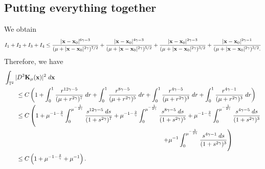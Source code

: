 \subsection{Putting everything together}
We obtain
\begin{align*}
    I_1+I_2+I_3+I_4 \leq  
                \frac
                {
                    |\mathbf{x}-\mathbf{x}_0|^{6\gamma-3}
                }
                {
                    (\mu+|\mathbf{x}-\mathbf{x}_0|^{2\gamma})^{7/2}
                }
    + 
                 \frac
                {
                    |\mathbf{x}-\mathbf{x}_0|^{4\gamma-3}
                }
                {
                    (\mu+|\mathbf{x}-\mathbf{x}_0|^{2\gamma})^{5/2}
                }
    + 
    \frac
                {
                    |\mathbf{x}-\mathbf{x}_0|^{2\gamma-3}
                }
                {
                    (\mu+|\mathbf{x}-\mathbf{x}_0|^{2\gamma})^{3/2}
                }
    + 
    \frac
                {
                    |\mathbf{x}-\mathbf{x}_0|^{2\gamma-1}
                }
                {
                    (\mu+|\mathbf{x}-\mathbf{x}_0|^{2\gamma})^{3/2}.
                }
\end{align*}
Therefore, we have
\begin{align*}
    &\int_{\mathbb{T}^2} |D^3\mathbf{K}_\mu(\mathbf{x})|^2\;d\mathbf{x} \\
    &\qquad 
    \leq C
    \left(
        1 
        + 
        \int_0^1 \frac{r^{12\gamma-5}}{(\mu+r^{2\gamma})^7}\;dr 
        + 
        \int_0^1 \frac{r^{8\gamma-5}}{(\mu+r^{2\gamma})^5}\;dr 
        +
        \int_0^1 \frac{r^{4\gamma-5}}{(\mu+r^{2\gamma})^3}\;dr 
        +
        \int_0^1 \frac{r^{4\gamma-1}}{(\mu+r^{2\gamma})^3}\;dr 
    \right)\\
    &\qquad 
    \leq C 
    \left(
        1 
        + 
        \mu^{-1-\frac{2}{\gamma}}\int_0^{\mu^{-\frac{1}{2\gamma}}} \frac{s^{12\gamma-5}\;ds}{(1+s^{2\gamma})^7}
        + 
        \mu^{-1-\frac{2}{\gamma}}\int_0^{\mu^{-\frac{1}{2\gamma}}} \frac{s^{8\gamma-5}\;ds}{(1+s^{2\gamma})^5} 
        + 
        \mu^{-1-\frac{2}{\gamma}}\int_0^{\mu^{-\frac{1}{2\gamma}}} \frac{s^{4\gamma-5}\;ds}{(1+s^{2\gamma})^3} 
        \right. \\
    &\qquad \qquad\qquad\qquad \qquad\qquad 
     \qquad \qquad\qquad\qquad \qquad\qquad\qquad
        \left. 
        + 
        \mu^{-1}\int_0^{\mu^{-\frac{1}{2\gamma}}} \frac{s^{4\gamma-1}\;ds}{(1+s^{2\gamma})^3} 
    \right) \\
    &\qquad \leq C\left(1 + \mu^{-1-\frac{2}{\gamma}} + \mu^{-1}\right).
\end{align*}